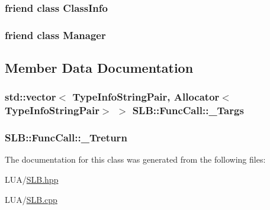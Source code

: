 \subsubsection[{\texorpdfstring{Class\+Info}{ClassInfo}}]{\setlength{\rightskip}{0pt plus 5cm}friend class {\bf Class\+Info}\hspace{0.3cm}{\ttfamily [friend]}}\hypertarget{classSLB_1_1FuncCall_ae6eaadf7953b7fe283a68d411b7b65b7}{}\label{classSLB_1_1FuncCall_ae6eaadf7953b7fe283a68d411b7b65b7}
\subsubsection[{\texorpdfstring{Manager}{Manager}}]{\setlength{\rightskip}{0pt plus 5cm}friend class {\bf Manager}\hspace{0.3cm}{\ttfamily [friend]}}\hypertarget{classSLB_1_1FuncCall_adddd5c43ff870a047aa66db4edf82a7e}{}\label{classSLB_1_1FuncCall_adddd5c43ff870a047aa66db4edf82a7e}


\subsection{Member Data Documentation}
\subsubsection[{\texorpdfstring{\+\_\+\+Targs}{_Targs}}]{\setlength{\rightskip}{0pt plus 5cm}std\+::vector$<$ {\bf Type\+Info\+String\+Pair}, {\bf Allocator}$<${\bf Type\+Info\+String\+Pair}$>$ $>$ S\+L\+B\+::\+Func\+Call\+::\+\_\+\+Targs\hspace{0.3cm}{\ttfamily [protected]}}\hypertarget{classSLB_1_1FuncCall_ad9bc8105dc36a15d4575fecfaf6095ce}{}\label{classSLB_1_1FuncCall_ad9bc8105dc36a15d4575fecfaf6095ce}
\subsubsection[{\texorpdfstring{\+\_\+\+Treturn}{_Treturn}}]{ S\+L\+B\+::\+Func\+Call\+::\+\_\+\+Treturn\hspace{0.3cm}{\ttfamily [protected]}}\hypertarget{classSLB_1_1FuncCall_a95da897833858c42336b06ef321966e4}{}\label{classSLB_1_1FuncCall_a95da897833858c42336b06ef321966e4}


The documentation for this class was generated from the following files\+:\begin{DoxyCompactItemize}
\item 
L\+U\+A/\hyperlink{SLB_8hpp}{S\+L\+B.\+hpp}\item 
L\+U\+A/\hyperlink{SLB_8cpp}{S\+L\+B.\+cpp}\end{DoxyCompactItemize}

